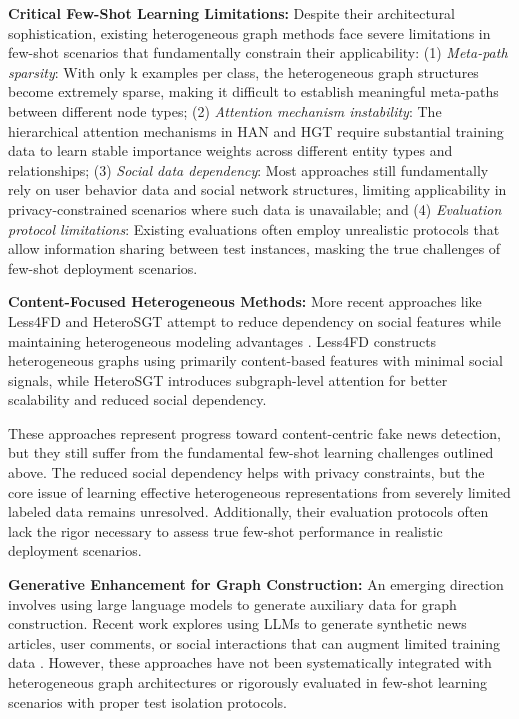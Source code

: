
\textbf{Critical Few-Shot Learning Limitations:} Despite their architectural sophistication, existing heterogeneous graph methods face severe limitations in few-shot scenarios that fundamentally constrain their applicability: (1) \emph{Meta-path sparsity}: With only k examples per class, the heterogeneous graph structures become extremely sparse, making it difficult to establish meaningful meta-paths between different node types; (2) \emph{Attention mechanism instability}: The hierarchical attention mechanisms in HAN and HGT require substantial training data to learn stable importance weights across different entity types and relationships; (3) \emph{Social data dependency}: Most approaches still fundamentally rely on user behavior data and social network structures, limiting applicability in privacy-constrained scenarios where such data is unavailable; and (4) \emph{Evaluation protocol limitations}: Existing evaluations often employ unrealistic protocols that allow information sharing between test instances, masking the true challenges of few-shot deployment scenarios.

\textbf{Content-Focused Heterogeneous Methods:} More recent approaches like Less4FD and HeteroSGT attempt to reduce dependency on social features while maintaining heterogeneous modeling advantages \cite{zhang2023less4fd, wang2023heterosgt}. Less4FD constructs heterogeneous graphs using primarily content-based features with minimal social signals, while HeteroSGT introduces subgraph-level attention for better scalability and reduced social dependency.

These approaches represent progress toward content-centric fake news detection, but they still suffer from the fundamental few-shot learning challenges outlined above. The reduced social dependency helps with privacy constraints, but the core issue of learning effective heterogeneous representations from severely limited labeled data remains unresolved. Additionally, their evaluation protocols often lack the rigor necessary to assess true few-shot performance in realistic deployment scenarios.

\textbf{Generative Enhancement for Graph Construction:} An emerging direction involves using large language models to generate auxiliary data for graph construction. Recent work explores using LLMs to generate synthetic news articles, user comments, or social interactions that can augment limited training data \cite{yang2023let, zhang2023enhancing}. However, these approaches have not been systematically integrated with heterogeneous graph architectures or rigorously evaluated in few-shot learning scenarios with proper test isolation protocols.


